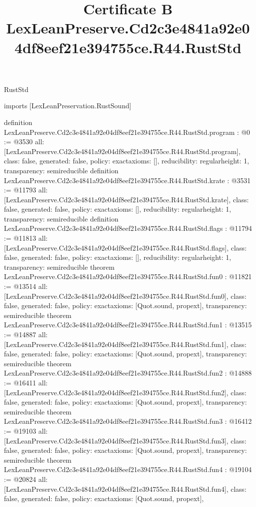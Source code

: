 \begin{lexlean}{RustStd}
\title{Certificate B LexLeanPreserve.Cd2c3e4841a92e04df8eef21e394755ce.R44.RustStd}
\begin{coremodule}
imports [LexLeanPreservation.RustSound]

definition LexLeanPreserve.Cd2c3e4841a92e04df8eef21e394755ce.R44.RustStd.program : @0 := @3530 {
  all: [LexLeanPreserve.Cd2c3e4841a92e04df8eef21e394755ce.R44.RustStd.program],
  class: false,
  generated: false,
  policy: exact{axioms: []},
  reducibility: regular{height: 1},
  transparency: semireducible
}
definition LexLeanPreserve.Cd2c3e4841a92e04df8eef21e394755ce.R44.RustStd.krate : @3531 := @11793 {
  all: [LexLeanPreserve.Cd2c3e4841a92e04df8eef21e394755ce.R44.RustStd.krate],
  class: false,
  generated: false,
  policy: exact{axioms: []},
  reducibility: regular{height: 1},
  transparency: semireducible
}
definition LexLeanPreserve.Cd2c3e4841a92e04df8eef21e394755ce.R44.RustStd.flags : @11794 := @11813 {
  all: [LexLeanPreserve.Cd2c3e4841a92e04df8eef21e394755ce.R44.RustStd.flags],
  class: false,
  generated: false,
  policy: exact{axioms: []},
  reducibility: regular{height: 1},
  transparency: semireducible
}
theorem LexLeanPreserve.Cd2c3e4841a92e04df8eef21e394755ce.R44.RustStd.fun0 : @11821 := @13514 {
  all: [LexLeanPreserve.Cd2c3e4841a92e04df8eef21e394755ce.R44.RustStd.fun0],
  class: false,
  generated: false,
  policy: exact{axioms: [Quot.sound, propext]},
  transparency: semireducible
}
theorem LexLeanPreserve.Cd2c3e4841a92e04df8eef21e394755ce.R44.RustStd.fun1 : @13515 := @14887 {
  all: [LexLeanPreserve.Cd2c3e4841a92e04df8eef21e394755ce.R44.RustStd.fun1],
  class: false,
  generated: false,
  policy: exact{axioms: [Quot.sound, propext]},
  transparency: semireducible
}
theorem LexLeanPreserve.Cd2c3e4841a92e04df8eef21e394755ce.R44.RustStd.fun2 : @14888 := @16411 {
  all: [LexLeanPreserve.Cd2c3e4841a92e04df8eef21e394755ce.R44.RustStd.fun2],
  class: false,
  generated: false,
  policy: exact{axioms: [Quot.sound, propext]},
  transparency: semireducible
}
theorem LexLeanPreserve.Cd2c3e4841a92e04df8eef21e394755ce.R44.RustStd.fun3 : @16412 := @19103 {
  all: [LexLeanPreserve.Cd2c3e4841a92e04df8eef21e394755ce.R44.RustStd.fun3],
  class: false,
  generated: false,
  policy: exact{axioms: [Quot.sound, propext]},
  transparency: semireducible
}
theorem LexLeanPreserve.Cd2c3e4841a92e04df8eef21e394755ce.R44.RustStd.fun4 : @19104 := @20824 {
  all: [LexLeanPreserve.Cd2c3e4841a92e04df8eef21e394755ce.R44.RustStd.fun4],
  class: false,
  generated: false,
  policy: exact{axioms: [Quot.sound, propext]},
}
\end{coremodule}
\end{lexlean}
